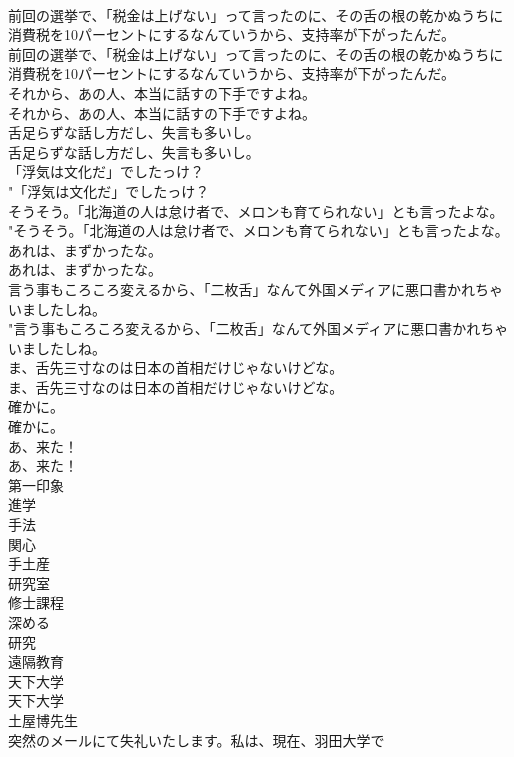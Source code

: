 \documentclass[8pt]{extreport}
\begin{document}
\begin{CJK}{UTF8}{min}
\\	前回の選挙で、「税金は上げない」って言ったのに、その舌の根の乾かぬうちに消費税を10パーセントにするなんていうから、支持率が下がったんだ。	
\\	前回の選挙で、「税金は上げない」って言ったのに、その舌の根の乾かぬうちに消費税を10パーセントにするなんていうから、支持率が下がったんだ。 
\\	それから、あの人、本当に話すの下手ですよね。	
\\	それから、あの人、本当に話すの下手ですよね。 
\\	舌足らずな話し方だし、失言も多いし。	
\\	舌足らずな話し方だし、失言も多いし。 
\\	「浮気は文化だ」でしたっけ？	
\\	"「浮気は文化だ」でしたっけ？ 
\\	そうそう。「北海道の人は怠け者で、メロンも育てられない」とも言ったよな。	
\\	"そうそう。「北海道の人は怠け者で、メロンも育てられない」とも言ったよな。 
\\	あれは、まずかったな。	
\\	あれは、まずかったな。 
\\	言う事もころころ変えるから、「二枚舌」なんて外国メディアに悪口書かれちゃいましたしね。	
\\	"言う事もころころ変えるから、「二枚舌」なんて外国メディアに悪口書かれちゃいましたしね。 
\\	ま、舌先三寸なのは日本の首相だけじゃないけどな。	
\\	ま、舌先三寸なのは日本の首相だけじゃないけどな。 
\\	確かに。	
\\	確かに。 
\\	あ、来た！	
\\	あ、来た！ 
\\	第一印象
\\	進学
\\	手法
\\	関心
\\	手土産
\\	研究室
\\	修士課程
\\	深める
\\	研究
\\	遠隔教育
\\	天下大学	
\\	天下大学 
\\	土屋博先生	
\\	突然のメールにて失礼いたします。私は、現在、羽田大学で

\end{CJK}
\end{document}

